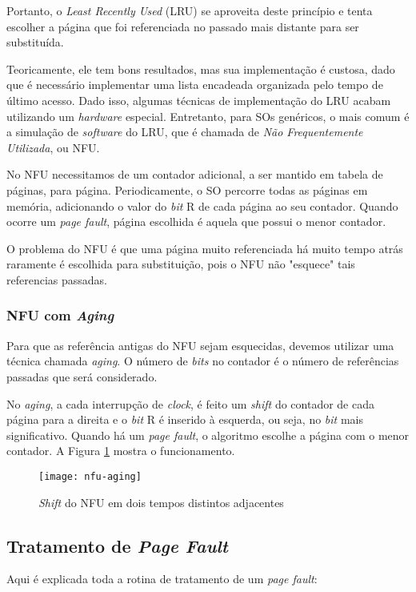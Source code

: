 Portanto, o \textit{Least Recently Used} (LRU) se aproveita deste princípio e tenta escolher a página que foi referenciada no passado mais distante para ser substituída.

Teoricamente, ele tem bons resultados, mas sua implementação é custosa, dado que é necessário implementar uma lista encadeada organizada pelo tempo de último acesso. Dado isso, algumas técnicas de implementação do LRU acabam utilizando um \textit{hardware} especial. Entretanto, para SOs genéricos, o mais comum é a simulação de \textit{software} do LRU, que é chamada de \textit{Não Frequentemente Utilizada}, ou NFU.

No NFU necessitamos de um contador adicional, a ser mantido em tabela de páginas, para página. Periodicamente, o SO percorre todas as páginas em memória, adicionando o valor do \textit{bit} R de cada página ao seu contador. Quando ocorre um \textit{page fault}, página escolhida é aquela que possui o menor contador.

O problema do NFU é que uma página muito referenciada há muito tempo atrás raramente é escolhida para substituição, pois o NFU não "esquece" tais referencias passadas.


\subsubsection{NFU com \textit{Aging}}
Para que as referência antigas do NFU sejam esquecidas, devemos utilizar uma técnica chamada \textit{aging}. O número de \textit{bits} no contador é o número de referências passadas que será considerado.

No \textit{aging}, a cada interrupção de \textit{clock}, é feito um \textit{shift} do contador de cada página para a direita e o \textit{bit} R é inserido à esquerda, ou seja, no \textit{bit} mais significativo. Quando há um \textit{page fault}, o algoritmo escolhe a página com o menor contador. A Figura \ref{fig:nfu-aging} mostra o funcionamento.

\begin{figure}[h]
  \centering
  \texttt{[image: nfu-aging]}
  \caption{\textit{Shift} do NFU em dois tempos distintos adjacentes}
  \label{fig:nfu-aging}
\end{figure}




\subsection{Tratamento de \textit{Page Fault}}
\label{sec:page-fault}
Aqui é explicada toda a rotina de tratamento de um \textit{page fault}:

